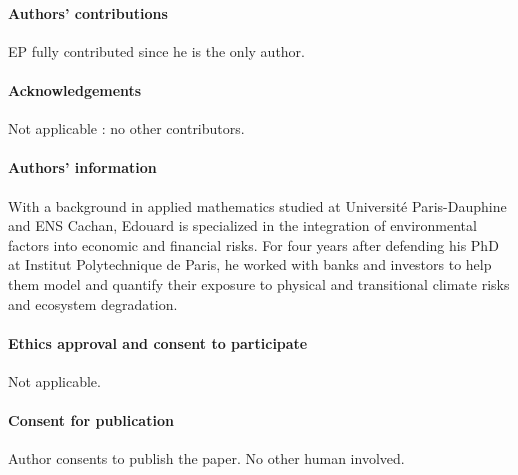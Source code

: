 \documentclass{article}
\begin{document}
\paragraph{Authors' contributions} EP fully contributed since he is the only author. 

\paragraph{Acknowledgements} Not applicable : no other contributors. 

\paragraph{Authors' information} With a background in applied mathematics studied at Université Paris-Dauphine and ENS Cachan, Edouard is specialized in the integration of environmental factors into economic and financial risks. For four years after defending his PhD at Institut Polytechnique de Paris, he worked with banks and investors to help them model and quantify their exposure to physical and transitional climate risks and ecosystem degradation. 

\paragraph{Ethics approval and consent to participate} Not applicable. 

\paragraph{Consent for publication} Author consents to publish the paper. No other human involved. 




\newpage

















\newpage

\appendix

\end{document}
